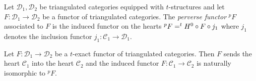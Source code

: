 \begin{definition}
 Let $\mathcal{D}_1,\mathcal{D}_2$ be triangulated categories equipped with $t$-structures and let $F:\mathcal{D}_1 \to \mathcal{D}_2$ be a functor of triangulated categories.
 The {\it perverse functor} $^pF$ associated to $F$ is the induced functor on the hearts $^pF = ^tH^0 \circ F \circ j_1$ where $j_1$ denotes the inclusion functor $j_1:\mathcal{C}_1\to \mathcal{D}_1$.
\end{definition}
\begin{proposition}{\cite[Proposition 5.1.9.]{dimca2004sheaves}}\label{prop: FunctorHeart}
  Let $F:\mathcal{D}_1 \to \mathcal{D}_2$ be a $t$-exact functor of triangulated categories.
  Then $F$ sends the heart $\mathcal{C}_1$ into the heart $\mathcal{C}_2$ and the induced functor $F:\mathcal{C}_1 \to \mathcal{C}_2$ is naturally isomorphic to $^pF$.
\end{proposition}
